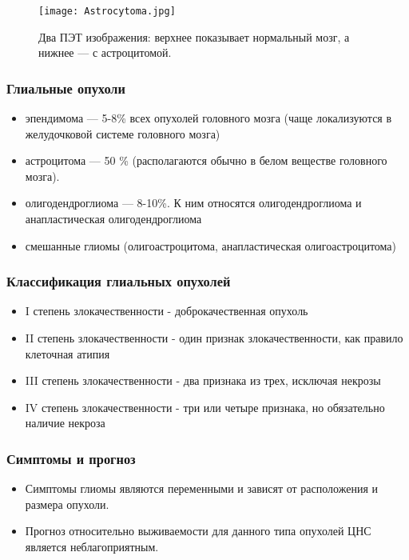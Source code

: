 \begin{frame}
  

    \begin{figure}
      \texttt{[image: Astrocytoma.jpg]}
      \caption{Два ПЭТ изображения: верхнее показывает нормальный мозг, а нижнее — с астроцитомой.}
    \end{figure}
  \end{frame}


\begin{frame}
  \frametitle{Глиальные опухоли}  
\begin{itemize}
  

    \item эпендимома — 5-8\% всех опухолей головного мозга (чаще локализуются в желудочковой системе головного мозга)
  \item астроцитома — 50 \% (располагаются обычно в белом веществе головного мозга).
  \item олигодендроглиома — 8-10\%. К ним относятся олигодендроглиома и анапластическая олигодендроглиома
  \item смешанные глиомы (олигоастроцитома, анапластическая олигоастроцитома)
 
   

  \end{itemize}
\end{frame}
\begin{frame}

  \frametitle{Классификация глиальных опухолей}  
  
    \begin{itemize}
      \item I степень злокачественности - доброкачественная опухоль
      \item II степень злокачественности - один признак злокачественности, как правило клеточная атипия
      \item III степень злокачественности - два признака из трех, исключая некрозы
      \item IV степень злокачественности - три или четыре признака, но обязательно наличие некроза
    \end{itemize}
  
  \end{frame}



\begin{frame}
  \frametitle{Симптомы и прогноз}
  \begin{itemize}
    \item Симптомы глиомы являются переменными и зависят от расположения и размера опухоли. 
   

  \item Прогноз относительно выживаемости для данного типа опухолей ЦНС является неблагоприятным. 
  
  \end{itemize}
\end{frame}


